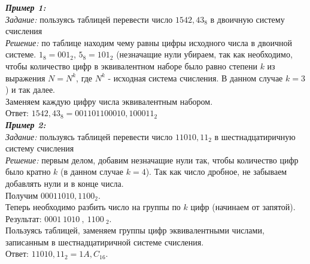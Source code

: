 \emph{\textbf{Пример 1:}}
\\\emph{Задание:} пользуясь таблицей перевести число $1542,43_{8}$ в двоичную систему счисления
\\\emph{Решение:} по таблице находим чему равны цифры исходного числа в двоичной системе. $1_{8} = 001_{2}$, $5_{8} = 101_{2}$ (незначащие нули убираем, так как необходимо, чтобы количество цифр в эквивалентном наборе было равно степени $k$ из выражения $N = N^{k}$, где $N^{k}$ - исходная система счисления. В данном случае $k = 3$) и так далее.
\\Заменяем каждую цифру числа эквивалентным набором.
\\Ответ: $1542,43_{8} = 001101100010,100011_{2}$
\\

\emph{\textbf{Пример 2:}}
\\\emph{Задание:} пользуясь таблицей перевести число $11010,11_{2}$ в шестнадцатиричную систему счисления
\\\emph{Решение:} первым делом, добавим незначащие нули так, чтобы количество цифр было кратно $k$ (в данном случае $k = 4$). Так как число дробное, не забываем добавлять нули и в конце числа. \\Получим $00011010,1100_{2}$.
\\Теперь необходимо разбить число на группы по $k$ цифр (начинаем от запятой). Результат: $0001\ 1010\ ,\ 1100\ _{2}$.
\\Пользуясь таблицей, заменяем группы цифр эквивалентными числами, записанным в шестнадцатиричной системе счисления.
\\Ответ: $11010,11_{2} = 1A,C_{16}$.


